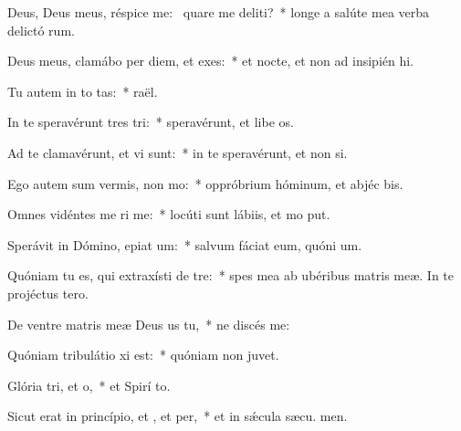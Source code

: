 \item Deus, Deus meus, réspice  me:~\pscross{} quare me deliti?~* longe a salúte mea verba delictó rum.
\item Deus meus, clamábo per diem, et  exes:~* et nocte, et non ad insipién hi.
\item Tu autem in to tas:~*  raël.
\item In te speravérunt tres tri:~* speravérunt, et libe os.
\item Ad te clamavérunt, et vi  sunt:~* in te speravérunt, et non  si.
\item Ego autem sum vermis,  non mo:~* oppróbrium hóminum, et abjéc bis.
\item Omnes vidéntes me ri me:~* locúti sunt lábiis, et mo put.
\item Sperávit in Dómino, epiat um:~* salvum fáciat eum, quóni  um.
\item Quóniam tu es, qui extraxísti  de tre:~* spes mea ab ubéribus matris meæ. In te projéctus   tero.
\item De ventre matris meæ Deus us  tu,~* ne discés  me:
\item Quóniam tribulátio xi est:~* quóniam non   juvet.
\item Glória tri, et o,~* et Spirí to.
\item Sicut erat in princípio, et , et per,~* et in sǽcula sæcu. men.
